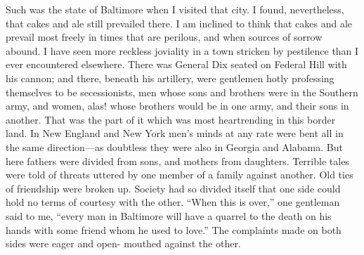 Such was the state of Baltimore when I visited that city.  I found,
nevertheless, that cakes and ale still prevailed there.  I am
inclined to think that cakes and ale prevail most freely in times
that are perilous, and when sources of sorrow abound.  I have seen
more reckless joviality in a town stricken by pestilence than I
ever encountered elsewhere.  There was General Dix seated on
Federal Hill with his cannon; and there, beneath his artillery,
were gentlemen hotly professing themselves to be secessionists, men
whose sons and brothers were in the Southern army, and women, alas!
whose brothers would be in one army, and their sons in another.
That was the part of it which was most heartrending in this border
land.  In New England and New York men's minds at any rate were
bent all in the same direction---as doubtless they were also in
Georgia and Alabama.  But here fathers were divided from sons, and
mothers from daughters.  Terrible tales were told of threats
uttered by one member of a family against another.  Old ties of
friendship were broken up.  Society had so divided itself that one
side could hold no terms of courtesy with the other.  ``When this is
over,'' one gentleman said to me, ``every man in Baltimore will have
a quarrel to the death on his hands with some friend whom he used
to love.''  The complaints made on both sides were eager and open-
mouthed against the other.

